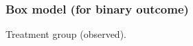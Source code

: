 \documentclass[handout]{beamer}
\begin{document}


   \begin{frame}
   \frametitle{Box model (for binary outcome)}
   \begin{center}
   \end{center}
   Treatment group (observed).
   \end{frame}
\end{document}
